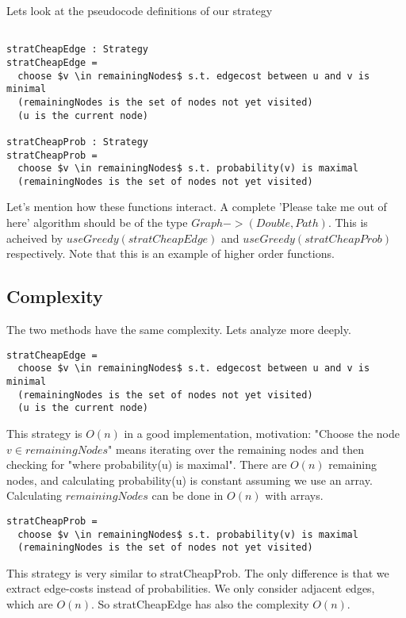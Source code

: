 \documentclass[a4paper,11pt]{article}
\begin{document}
Lets look at the pseudocode definitions of our strategy

\begin{lstlisting}[mathescape]

stratCheapEdge : Strategy
stratCheapEdge =
  choose $v \in remainingNodes$ s.t. edgecost between u and v is minimal
  (remainingNodes is the set of nodes not yet visited)
  (u is the current node)

stratCheapProb : Strategy
stratCheapProb =
  choose $v \in remainingNodes$ s.t. probability(v) is maximal
  (remainingNodes is the set of nodes not yet visited)

\end{lstlisting}

Let's mention how these functions interact.
A complete 'Please take me out of here' algorithm should be of
the type $Graph -> (Double, Path)$. This is acheived by
$useGreedy(stratCheapEdge)$ and $useGreedy(stratCheapProb)$ respectively.
Note that this is an example of higher order functions.

\subsection{Complexity}
The two methods have the same complexity. Lets analyze more deeply.

\begin{lstlisting}[mathescape]
stratCheapEdge =
  choose $v \in remainingNodes$ s.t. edgecost between u and v is minimal
  (remainingNodes is the set of nodes not yet visited)
  (u is the current node)
\end{lstlisting}

This strategy is $O(n)$ in a good implementation, motivation:
"Choose the node $v \in remainingNodes$" means iterating over
the remaining nodes and then checking for "where probability(u) is maximal".
There are $O(n)$ remaining nodes, and calculating probability(u) is constant
assuming we use an array.
Calculating $remainingNodes$ can be done in $O(n)$ with arrays.

\begin{lstlisting}[mathescape]
stratCheapProb =
  choose $v \in remainingNodes$ s.t. probability(v) is maximal
  (remainingNodes is the set of nodes not yet visited)
\end{lstlisting}

This strategy is very similar to stratCheapProb. The only difference
is that we extract edge-costs instead of probabilities.
We only consider adjacent edges, which are $O(n)$.
So stratCheapEdge has also the complexity $O(n)$.
\end{document}
